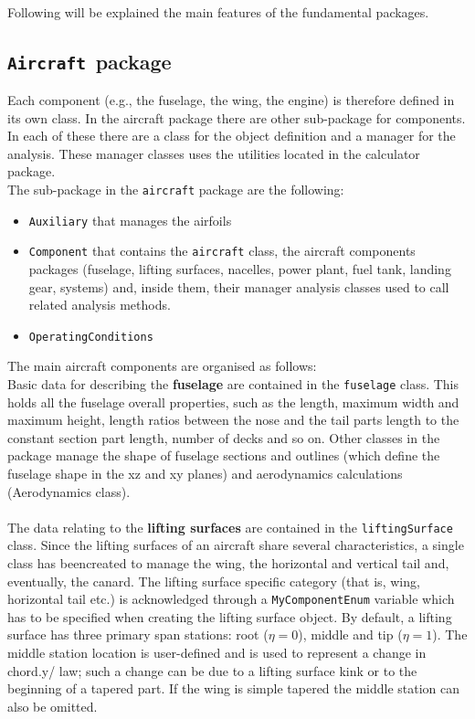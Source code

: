  \noindent \\
 Following will be explained the main features of the fundamental packages.
 
 \subsection{\texttt{Aircraft }package}
 Each component (e.g., the fuselage, the wing, the engine) is therefore defined in its own class. In the aircraft package there are other sub-package for components. In each of these there are a class for the object definition and a manager for the analysis. These manager classes uses the utilities located in the calculator package. \\
 The sub-package in the \texttt{aircraft} package are the following:
 
 \begin{itemize}
 \item \texttt{Auxiliary} that manages the airfoils
 \item  \texttt{Component} that contains the \texttt{aircraft} class, the aircraft components packages (fuselage, lifting surfaces, nacelles, power plant, fuel tank, landing gear, systems) and, inside them, their manager analysis classes used to call related analysis methods. 
 \item \texttt{OperatingConditions} 
 \end{itemize}

The main aircraft components are organised as follows: \\ 

Basic data for describing the {\bfseries fuselage} are contained in the \texttt{fuselage} class. This holds all the fuselage overall properties, such as the length, maximum width and maximum height, length ratios between the nose and the tail parts length to the constant section part length, number of decks and so on. Other classes in the package manage the shape of fuselage sections and outlines (which define the fuselage shape in the xz and xy planes) and aerodynamics calculations (Aerodynamics class).\\ \\

The data relating to the {\bfseries lifting surfaces} are contained in the \texttt{liftingSurface } class. Since the lifting surfaces of an aircraft share several characteristics, a single class has beencreated to manage the wing, the horizontal and vertical tail and, eventually, the canard. The lifting surface specific category (that is, wing, horizontal tail etc.) is acknowledged through a \texttt{MyComponentEnum} variable which has to be specified when creating the lifting surface object. By default, a lifting surface has three primary span stations: root ($\eta = 0$), middle and tip ($\eta = 1$). The middle station location is user-defined and is used to represent a change in chord.y/ law; such a change can be due to a lifting surface kink or to the beginning of a tapered part. If the wing is simple tapered the middle station can also be omitted.\\ \\

